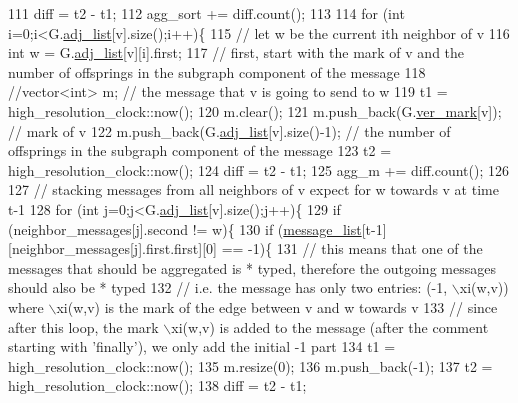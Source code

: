 \begin{DoxyCode}
111         diff = t2 - t1;
112         agg\_sort += diff.count();
113 
114         \textcolor{keywordflow}{for} (\textcolor{keywordtype}{int} i=0;i<G.\hyperlink{classmarked__graph_a1a0bf7ca413a278763f7c878b3b6fd6f}{adj\_list}[v].size();i++)\{
115           \textcolor{comment}{// let w be the current ith neighbor of v}
116           \textcolor{keywordtype}{int} w = G.\hyperlink{classmarked__graph_a1a0bf7ca413a278763f7c878b3b6fd6f}{adj\_list}[v][i].first;
117           \textcolor{comment}{// first, start with the mark of v and the number of offsprings in the subgraph component of the
       message}
118           \textcolor{comment}{//vector<int> m; // the message that v is going to send to w}
119           t1 = high\_resolution\_clock::now();
120           m.clear();
121           m.push\_back(G.\hyperlink{classmarked__graph_ac83e9377dd4d8bb95be1ac949b127296}{ver\_mark}[v]); \textcolor{comment}{// mark of v}
122           m.push\_back(G.\hyperlink{classmarked__graph_a1a0bf7ca413a278763f7c878b3b6fd6f}{adj\_list}[v].size()-1); \textcolor{comment}{// the number of offsprings in the subgraph
       component of the message}
123           t2 = high\_resolution\_clock::now();
124           diff = t2 - t1;
125           agg\_m += diff.count();
126 
127           \textcolor{comment}{// stacking messages from all neighbors of v expect for w towards v at time t-1}
128           \textcolor{keywordflow}{for} (\textcolor{keywordtype}{int} j=0;j<G.\hyperlink{classmarked__graph_a1a0bf7ca413a278763f7c878b3b6fd6f}{adj\_list}[v].size();j++)\{
129             \textcolor{keywordflow}{if} (neighbor\_messages[j].second != w)\{
130               \textcolor{keywordflow}{if} (\hyperlink{classgraph__message_aa17fdb629b423343edfafa97252763ef}{message\_list}[t-1][neighbor\_messages[j].first.first][0] == -1)\{
131                 \textcolor{comment}{// this means that one of the messages that should be aggregated is * typed, therefore the
       outgoing messages should also be * typed}
132                 \textcolor{comment}{// i.e. the message has only two entries: (-1, \(\backslash\)xi(w,v)) where \(\backslash\)xi(w,v) is the mark of the
       edge between v and w towards v}
133                 \textcolor{comment}{// since after this loop, the mark \(\backslash\)xi(w,v) is added to the message (after the comment
       starting with 'finally'), we only add the initial -1 part}
134                 t1 = high\_resolution\_clock::now();
135                 m.resize(0);
136                 m.push\_back(-1);
137                 t2 = high\_resolution\_clock::now();
138                 diff = t2 - t1;

\end{DoxyCode}
